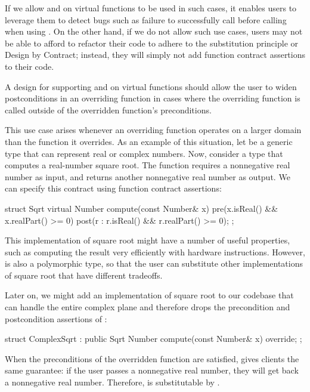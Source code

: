 If we allow  and  on virtual functions to be used in such cases, it enables users to leverage them to detect bugs such as failure to  successfully call  before calling  when using . On the other hand, if we do not allow such use cases, users may not be able to afford to refactor their code to adhere to the substitution principle or Design by Contract; instead, they will simply not add function contract assertions to their code.



A design for supporting  and  on virtual functions should allow the user to widen postconditions in an overriding function in cases where the overriding function is called outside of the overridden function's preconditions.

This use case arises whenever an overriding function operates on a larger domain than the function it overrides. As an example of this situation, let  be a generic type that can represent real or complex numbers. Now, consider a type  that computes a real-number square root. The function  requires a nonnegative real number as input, and returns another nonnegative real number as output. We can specify this contract using function contract assertions:

\begin{codeblock}
struct Sqrt {
  virtual Number compute(const Number& x)
    pre(x.isReal() && x.realPart() >= 0)
    post(r : r.isReal() && r.realPart() >= 0);
};
\end{codeblock}

This implementation of square root might have a number of useful properties, such as computing the result very efficiently with hardware instructions. However,  is also a polymorphic type, so that the user can substitute other implementations of square root that have different tradeoffs.

Later on, we might add an implementation of square root to our codebase that can handle the entire complex plane and therefore drops the precondition and postcondition assertions of :

\begin{codeblock}
struct ComplexSqrt : public Sqrt {
  Number compute(const Number& x) override;
};
\end{codeblock}
When the preconditions of the overridden function  are satisfied, \allowbreak{} gives clients the same guarantee: if the user passes a nonnegative real number, they will get back a nonnegative real number. Therefore,  is substitutable by . 

